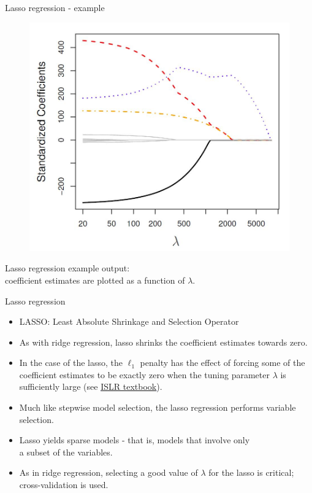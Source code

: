 \documentclass{beamer}
\begin{document}
\begin{frame}{Lasso regression - example}
\vspace{-1cm}
\begin{figure}
\includegraphics[scale=0.30]{IMG/Lasso.jpg}
\end{figure}
\vspace{-0.5cm}
\centering Lasso regression example output: \\coefficient estimates are plotted as a function of $\lambda$.
\end{frame}
\begin{frame}{Lasso regression}

\begin{itemize}
\item LASSO: Least Absolute Shrinkage and Selection Operator
\medskip
\item As with ridge regression, lasso shrinks the coefficient
estimates towards zero.
\medskip
\item In the case of the lasso, the $\ell_1$ penalty has the
effect of forcing some of the coefficient estimates to be
exactly zero when the tuning parameter $\lambda$ is
sufficiently large (see \textcolor{blue}{\underline{\href{http://www-bcf.usc.edu/~gareth/ISL/}{ISLR textbook}}}).
\medskip
\item Much like stepwise model selection, the lasso regression performs variable selection.
\medskip
\item Lasso yields sparse models - that is, models that involve only \\a subset of the variables.
\medskip
\item As in ridge regression, selecting a good value of $\lambda$ for the
lasso is critical; cross-validation is used.
\end{itemize}
\end{frame}
\end{document}
